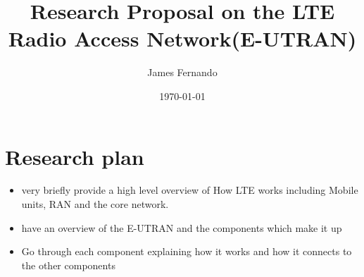 \documentclass[a4paper,12pt]{scrartcl}
\title{Research Proposal on the LTE Radio Access Network(E-UTRAN)}
\author{James Fernando}
\date{\today}
\begin{document}
	
	\begin{titlepage}
		\maketitle
	\end{titlepage}
	
	\tableofcontents
	\newpage	

	\section{Research plan}
	{
		\begin{itemize}
			\item {very briefly provide a high level overview of How LTE works including Mobile units, RAN and the core network.}
			\item {have an overview of the E-UTRAN and the components which make it up}
			\item  {Go through each component explaining how it works and how it connects to the other components}
		\end{itemize}
	}
	
	
	
	\newpage
	
	\printbibliography[heading=bibintoc,title=References]
\end{document}
